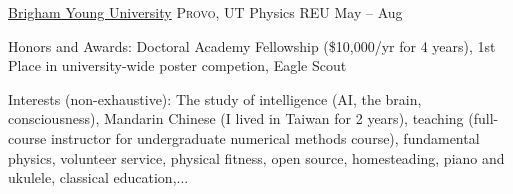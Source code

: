 \documentclass[11pt,a4paper]{article}
\begin{document}
\headedsection
  {\href{http://www.byu.edu}{Brigham Young University}}
  {\textsc{Provo, UT}} {%
      \headedsubsection
     {Physics REU}
     {May  -- Aug }
     {}
}

\spacedhrule{0.2em}{0.2em}  %

\inlineheadsection
  {Honors and Awards:}
  {Doctoral Academy Fellowship (\$10,000/yr for 4 years),  1st Place in university-wide poster competion, Eagle Scout}

\inlineheadsection
  {Interests (non-exhaustive):}
  {
      The study of intelligence (AI, the brain, consciousness), 
      Mandarin Chinese (I lived in Taiwan for 2 years), 
      teaching (full-course instructor for undergraduate numerical methods course), 
      fundamental physics, volunteer service, physical fitness, open source, 
      homesteading, piano and ukulele, classical education,...
  }
\end{document}
